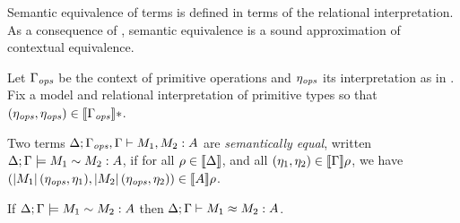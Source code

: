 Semantic equivalence of terms is defined in terms of the relational
interpretation. As a consequence of , semantic
equivalence is a sound approximation of contextual equivalence.

  Let $\Gamma_{\mathit{ops}}$ be the context of primitive operations and $\eta_{\mathit{ops}}$  its interpretation as in
  . Fix a model and relational interpretation of primitive types so that
  $(\eta_{\mathit{ops}}, \eta_{\mathit{ops}}) \in  \llbracket \Gamma_{\mathit{ops}} \rrbracket *$.

\begin{definition}\label{def:semantic-equality}
  Two terms $\Delta; \Gamma_{\mathit{ops}}, \Gamma \vdash M_1 , M_2 : A$
  are
  \emph{semantically equal},
  written ${\Delta};{\Gamma}\models{M_1}\sim{M_2}:{A}$, if for all $\rho \in
  \llbracket \Delta \rrbracket$, and all $(\eta_1,\eta_2) \in
  \llbracket \Gamma \rrbracket \rho$, we have
  $(\left| M_1\right|(\eta_{\mathit{ops}},
  \eta_1),\left| M_2\right|(\eta_{\mathit{ops}}, \eta_2)) \in
  \llbracket A \rrbracket\rho$.
\end{definition}

\begin{theorem}[Soundness]\label{thm:soundness}
If ${\Delta};{\Gamma}\models{M_1}\sim{M_2}:{A}$ then
${\Delta};{\Gamma}\vdash{M_1}\approx{M_2}:{A}$.
\end{theorem}


